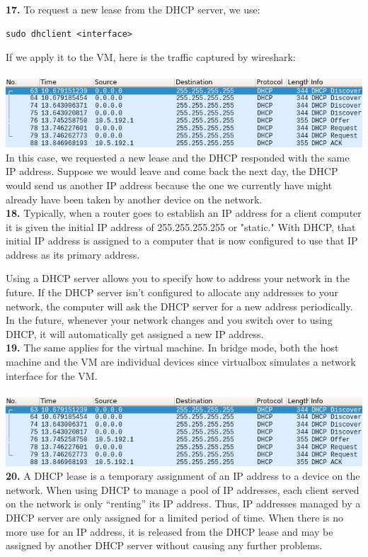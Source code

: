 \documentclass[12pt]{extarticle}
\begin{document}
\textbf{17.} To request a new lease from the DHCP server, we use:
\begin{verbatim}
sudo dhclient <interface>
\end{verbatim}
If we apply it to the VM, here is the traffic captured by wireshark:\\~\\
\includegraphics[scale=0.6]{resources/16.png}\\
In this case, we requested a new lease and the DHCP responded with the same IP address. Suppose we would leave and come back the next day, the DHCP would send us another IP address because the one we currently have might already have been taken by another device on the network.\\

\textbf{18.} 
Typically, when a router goes to establish an IP address for a client computer it is given the initial IP address of 255.255.255.255 or "static." With DHCP, that initial IP address is assigned to a computer that is now configured to use that IP address as its primary address.

Using a DHCP server allows you to specify how to address your network in the future. If the DHCP server isn't configured to allocate any addresses to your network, the computer will ask the DHCP server for a new address periodically. In the future, whenever your network changes and you switch over to using DHCP, it will automatically get assigned a new IP address.\\

\textbf{19.} The same applies for the virtual machine. In bridge mode, both the host machine and the VM are individual devices since virtualbox simulates a network interface for the VM.\\~\\
\includegraphics[scale=0.6]{resources/16.png}\\

\textbf{20.} A DHCP lease is a temporary assignment of an IP address to a device on the network. When using DHCP to manage a pool of IP addresses, each client served on the network is only “renting” its IP address. Thus, IP addresses managed by a DHCP server are only assigned for a limited period of time. When there is no more use for an IP address, it is released from the DHCP lease and may be assigned by another DHCP server without causing any further problems.
\end{document}
